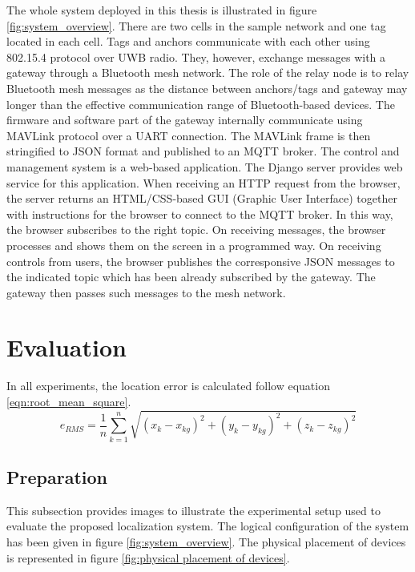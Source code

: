 \documentclass[\main/main.tex]{subfiles}
\begin{document}
The whole system deployed in this thesis is illustrated in figure \ref{fig:system_overview}. There are two cells in the sample network and one tag located in each cell. Tags and anchors communicate with each other using 802.15.4 protocol over UWB radio. They, however, exchange messages with a gateway through a Bluetooth mesh network. The role of the relay node is to relay Bluetooth mesh messages as the distance between anchors/tags and gateway may longer than the effective communication range of Bluetooth-based devices. The firmware and software part of the gateway internally communicate using MAVLink protocol over a UART connection. The MAVLink frame is then stringified to JSON format and published to an MQTT broker. The control and management system is a web-based application. The Django server provides web service for this application. When receiving an HTTP request from the browser, the server returns an HTML/CSS-based GUI (Graphic User Interface) together with instructions for the browser to connect to the MQTT broker. In this way, the browser subscribes to the right topic. On receiving messages, the browser processes and shows them on the screen in a programmed way. On receiving controls from users, the browser publishes the corresponsive JSON messages to the indicated topic which has been already subscribed by the gateway. The gateway then passes such messages to the mesh network.

\section{Evaluation}

In all experiments, the location error is calculated follow equation \ref{eqn:root_mean_square}.
\begin{equation}
    e_{RMS} = \frac{1}{n} \sum_{k=1}^{n} \sqrt{(x_k-x_{kg})^2 + (y_k-y_{kg})^2 + (z_k-z_{kg})^2}
    \label{eqn:root_mean_square}
\end{equation}

\subsection{Preparation}
This subsection provides images to illustrate the experimental setup used to evaluate the proposed localization system. The logical configuration of the system has been given in figure \ref{fig:system_overview}. The physical placement of devices is represented in figure \ref{fig:physical placement of devices}.
\end{document}
